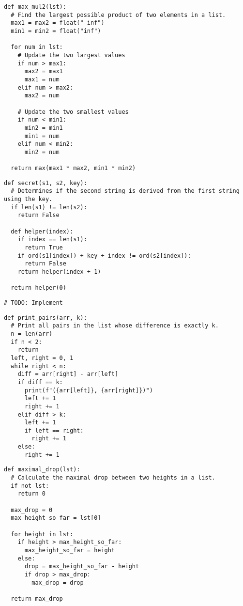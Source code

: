 \documentclass[11pt]{article}
\begin{document}
\begin{lstlisting}
def max_mul2(lst):
  # Find the largest possible product of two elements in a list.
  max1 = max2 = float("-inf")
  min1 = min2 = float("inf")

  for num in lst:
    # Update the two largest values
    if num > max1:
      max2 = max1
      max1 = num
    elif num > max2:
      max2 = num

    # Update the two smallest values
    if num < min1:
      min2 = min1
      min1 = num
    elif num < min2:
      min2 = num

  return max(max1 * max2, min1 * min2)
\end{lstlisting}

\begin{lstlisting}
def secret(s1, s2, key):
  # Determines if the second string is derived from the first string using the key.
  if len(s1) != len(s2):
    return False

  def helper(index):
    if index == len(s1):
      return True
    if ord(s1[index]) + key + index != ord(s2[index]):
      return False
    return helper(index + 1)

  return helper(0)
\end{lstlisting}

\begin{lstlisting}
# TODO: Implement
\end{lstlisting}

\begin{lstlisting}
def print_pairs(arr, k):
  # Print all pairs in the list whose difference is exactly k.
  n = len(arr)
  if n < 2:
    return
  left, right = 0, 1
  while right < n:
    diff = arr[right] - arr[left]
    if diff == k:
      print(f"({arr[left]}, {arr[right]})")
      left += 1
      right += 1
    elif diff > k:
      left += 1
      if left == right:
        right += 1
    else:
      right += 1
\end{lstlisting}

\begin{lstlisting}
def maximal_drop(lst):
  # Calculate the maximal drop between two heights in a list.
  if not lst:
    return 0

  max_drop = 0
  max_height_so_far = lst[0]

  for height in lst:
    if height > max_height_so_far:
      max_height_so_far = height
    else:
      drop = max_height_so_far - height
      if drop > max_drop:
        max_drop = drop

  return max_drop
\end{lstlisting}
\end{document}
